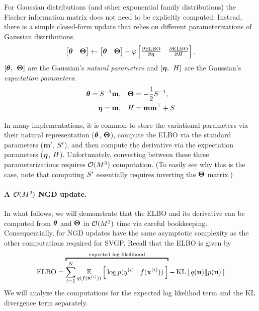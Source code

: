 For Gaussian distributions (and other exponential family distributions) the Fischer information matrix does not need to be explicitly computed.
Instead, there is a simple closed-form update that relies on different parameterizations of Gaussian distributions.
%
\begin{equation}
  \begin{bmatrix} \boldsymbol{\theta} & \boldsymbol{\Theta} \end{bmatrix} \gets \begin{bmatrix} \boldsymbol{\theta} & \boldsymbol{\Theta} \end{bmatrix} - \varphi
  \begin{bmatrix} \frac{\partial \text{ELBO}}{\partial \boldsymbol{\eta}} & \frac{\partial \text{ELBO}}{\partial H} \end{bmatrix}.
\end{equation}
%
$[\boldsymbol{\theta}, \:\: \boldsymbol{\Theta}]$ are the Gaussian's \emph{natural parameters}
and $[\boldsymbol{\eta}, \:\: H]$ are the Gaussian's \emph{expectation parameters}:
%
\begin{align*}
  \boldsymbol{\theta} = S^{-1} \mathbf{m}, &\quad
  \boldsymbol{\Theta} = -\frac 1 2 S^{-1}, \\
  \boldsymbol{\eta} = \mathbf{m}, &\quad
  H = \mathbf{m} \mathbf{m}^\top + S
\end{align*}

In many implementations, it is common to store the variational parameters via their natural representation ($\boldsymbol{\theta}$, $\boldsymbol{\Theta}$), compute the ELBO via the standard parameters ($\mathbf{m}'$, $S'$), and then compute the derivative via the expectation parameters ($\boldsymbol{\eta}$, $H$).
Unfortunately, converting between these three parameterizations requires $\bigo{M^3}$ computation.
(To easily see why this is the case, note that computing $S'$ essentially requires inverting the $\boldsymbol{\Theta}$ matrix.)

\paragraph{A $\bigo{M^2}$ NGD update.}
In what follows, we will demonstrate that the ELBO and its derivative can be computed from $\boldsymbol{\theta}$ and $\boldsymbol{\Theta}$ in $\bigo{M^2}$ time via careful bookkeeping.
Consequentially, for NGD updates have the same asymptotic complexity as the other computations required for SVGP.
Recall that the ELBO is given by
\[
  \text{ELBO} = \overbracket{ \sum_{i=1}^N \Evover{q(f(\bx^{(i)}))}{  \: \log p( y^{(i)} \mid f(\bx^{(i)}) ) \: }}^{\text{expected log likelihood}} - \kl{ q(\bu) }{ p(\bu) }
\]
We will analyze the computations for the expected log likelihod term and the KL divergence term separately.

